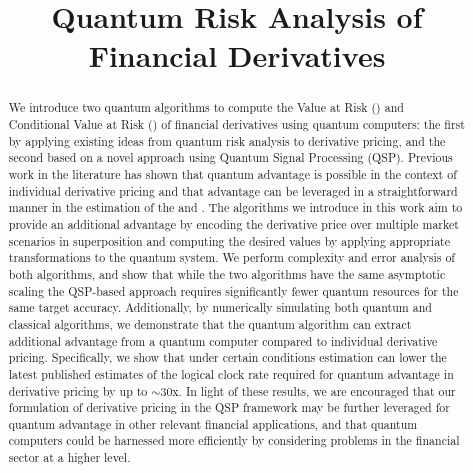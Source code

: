 
\title{Quantum Risk Analysis of Financial Derivatives}
\begin{abstract}
	We introduce two quantum algorithms to compute the Value at Risk (\var{}) and Conditional Value at Risk (\cvar{}) of financial derivatives using quantum computers: the first by applying existing ideas from quantum risk analysis to derivative pricing, and the second based on a novel approach using Quantum Signal Processing (QSP).
	Previous work in the literature has shown that quantum advantage is possible in the context of individual derivative pricing and that advantage can be leveraged in a straightforward manner in the estimation of the \var{} and \cvar{}.
	The algorithms we introduce in this work aim to provide an additional advantage by encoding the derivative price over multiple market scenarios in superposition and computing the desired values by applying appropriate transformations to the quantum system.
	We perform complexity and error analysis of both algorithms, and show that while the two algorithms have the same asymptotic scaling the QSP-based approach requires significantly fewer quantum resources for the same target accuracy.
	Additionally, by numerically simulating both quantum and classical \var{} algorithms, we demonstrate that the quantum algorithm can extract additional advantage from a quantum computer compared to individual derivative pricing.
	Specifically, we show that under certain conditions \var{} estimation can lower the latest published estimates of the logical clock rate required for quantum advantage in derivative pricing by up to $\sim 30$x.
	In light of these results, we are encouraged that our formulation of derivative pricing in the QSP framework may be further leveraged for quantum advantage in other relevant financial applications, and that quantum computers could be harnessed more efficiently by considering problems in the financial sector at a higher level.
\end{abstract}
\maketitle

